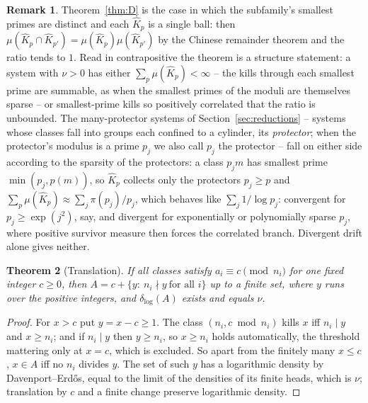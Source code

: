 \documentclass[11pt]{article}
\theoremstyle{plain}
\newtheorem{theorem}{Theorem}[section]
\theoremstyle{definition}
\newtheorem{remark}[theorem]{Remark}
\newcommand{\dlog}{\delta_{\log}}
\newcommand{\Kh}{\widehat{K}}
\begin{document}
\begin{remark}
Theorem~\ref{thm:D} is the case in which the subfamily's
smallest primes are distinct and each $\Kh_p$ is a single ball:
then $\mu(\Kh_p\cap \Kh_{p'})=\mu(\Kh_p)\mu(\Kh_{p'})$ by the Chinese
remainder theorem and the ratio tends to $1$.  Read in
contrapositive the theorem is a structure statement: a system
with $\nu>0$ has either $\sum_p\mu(\Kh_p)<\infty$ -- the kills
through each smallest prime are summable, as when the smallest
primes of the moduli are themselves sparse -- or smallest-prime
kills so positively correlated that the ratio is unbounded.
The many-protector systems of Section~\ref{sec:reductions} --
systems whose classes fall into groups each confined to a
cylinder, its \emph{protector}; when the protector's modulus is a
prime $p_j$ we also call $p_j$ the protector -- fall on either
side according to the sparsity of the protectors: a class $p_jm$ has
smallest prime $\min(p_j,p(m))$, so $\Kh_p$ collects only the
protectors $p_j\ge p$ and $\sum_p\mu(\Kh_p)\approx\sum_j\pi(p_j)/p_j$,
which behaves like $\sum_j1/\log p_j$: convergent for
$p_j\ge\exp(j^{2})$, say, and divergent for exponentially or
polynomially sparse $p_j$, where positive survivor measure then
forces the correlated branch.  Divergent drift alone gives
neither.
\end{remark}

\begin{theorem}[Translation]\label{thm:transl}
If all classes satisfy $a_i\equiv c\pmod{n_i}$ for one fixed
integer $c\ge0$, then $A=c+\{y:\ n_i\nmid y\ \text{for all }i\}$
up to a finite set, where $y$ runs over the positive integers,
and $\dlog(A)$ exists and equals $\nu$.
\end{theorem}

\begin{proof}
For $x>c$ put $y=x-c\ge1$.  The class $(n_i,c\bmod n_i)$ kills
$x$ iff $n_i\mid y$ and $x\ge n_i$; and if $n_i\mid y$ then
$y\ge n_i$, so $x\ge n_i$ holds automatically, the threshold
mattering only at $x=c$, which is excluded.  So apart from the
finitely many $x\le c$, $x\in A$
iff no $n_i$ divides $y$.  The set of such $y$ has a logarithmic
density by Davenport--Erd\H{o}s, equal to the limit of the
densities of its finite heads, which is $\nu$; translation by
$c$ and a finite change preserve logarithmic density.
\end{proof}
\end{document}
